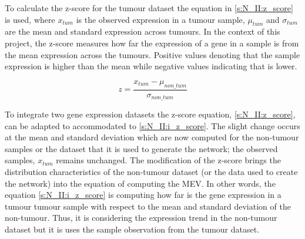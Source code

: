 To calculate the z-score for the tumour dataset the equation in \cref{s:N_II:z_score} is used, where $x_{tum}$ is the observed expression in a tumour sample, $\mu_{tum}$ and $\sigma_{tum}$ are the mean and standard expression across tumours. In the context of this project, the z-score measures how far the expression of a gene in a sample is from the mean expression across the tumours. Positive values denoting that the sample expression is higher than the mean while negative values indicating that is lower.


\begin{equation} \label{s:N_II:i_z_score}
z = \frac{x_{tum} - \mu_{non\_tum}}{\sigma_{non\_tum}}
\end{equation}

To integrate two gene expression datasets the z-score equation, \cref{s:N_II:z_score}, can be adapted to accommodated to \cref{s:N_II:i_z_score}. The slight change occurs at the mean and standard deviation which are now computed for the non-tumour samples or the dataset that it is used to generate the network; the observed samples, $x_{tum}$ remains unchanged. The modification of the z-score brings the distribution characteristics of the non-tumour dataset (or the data used to create the network) into the equation of computing the MEV. In other words, the equation \cref{s:N_II:i_z_score} is computing how far is the gene expression in a tumour tumour sample with respect to the mean and standard deviation of the non-tumour. Thus, it is considering the expression trend in the non-tumour dataset but it is uses the sample observation from the tumour dataset.


